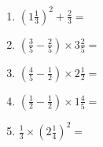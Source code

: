 \documentclass[12pt]{article}
\begin{document}
\begin{enumerate}
\item \large $ \left( 1 \frac{1}{3} \right)^2 + \frac{2}{3} = $ \vspace{1.6cm}
\item \large $ \left( \frac{3}{5} - \frac{2}{5} \right) \times 3 \frac{2}{5} = $ \vspace{1.6cm}
\item \large $ \left( \frac{4}{5} - \frac{1}{2} \right) \times 2 \frac{1}{2} = $ \vspace{1.6cm}
\item \large $ \left( \frac{1}{2} - \frac{1}{2} \right) \times 1 \frac{4}{5} = $ \vspace{1.6cm}
\item \large $ \frac{1}{3} \times \left( 2 \frac{1}{4} \right)^2 = $ \vspace{1.6cm}
\end{enumerate}\newpage
\end{document}
